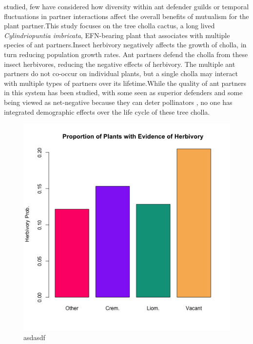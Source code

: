 \documentclass[11pt]{article}\usepackage[sc]{mathpazo} %
\begin{document}
studied\cite{Ness2006,Beattie1985,Schultheiss2022}, few have considered how diversity within ant defender guilds\cite{Stanton2013} or temporal fluctuations in partner interactions\cite{Trøjelsgaard2015} affect the overall benefits of mutualism for the plant partner.This study focuses on the tree cholla cactus, a long lived \textit{Cylindriopuntia imbricata}, EFN-bearing plant that associates with multiple species of ant partners.Insect herbivory negatively affects the growth of cholla, in turn reducing population growth rates\cite{Miller2009}. Ant partners defend the cholla from these insect herbivores, reducing the negative effects of herbivory\cite{Miller2007}. The multiple ant partners do not co-occur on individual plants, but a single cholla may interact with multiple types of partners over its lifetime.While the quality of ant partners in this system has been studied, with some seen as superior defenders and some  being viewed as net-negative because they can deter pollinators \cite{Ohm2014}, no one has integrated demographic effects over the life cycle of these tree cholla.
  
  \begin{figure}[h]	
    \includegraphics[width=.8\linewidth]{herb_ant_only_flow.png}	
    \caption{asdasdf}	
    \label{fig:herb}
  \end{figure}
  
\end{document}
